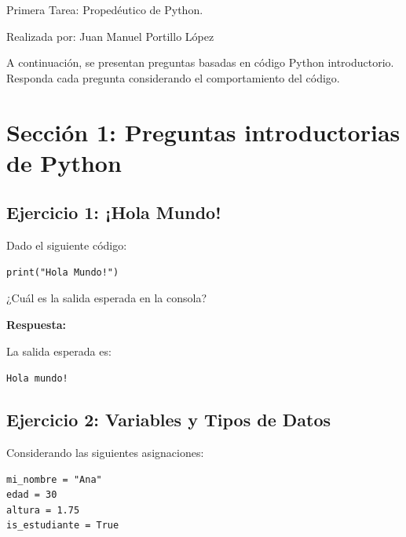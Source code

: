 \documentclass[12pt]{article}
\newcommand{\respuesta}{
    \vspace{0.3cm}
    \noindent\textbf{Respuesta:}
    \vspace{0.2cm}
}
\begin{document}
\begin{center}
    {\LARGE Primera Tarea: Propedéutico de Python.}

    \vspace{0.5cm}

    {\large Realizada por: Juan Manuel Portillo López}
\end{center}

\vspace{1cm}

\noindent
A continuación, se presentan preguntas basadas en código Python introductorio. 
Responda cada pregunta considerando el comportamiento del código.

\vspace{0.8cm}

\section*{Sección 1: Preguntas introductorias de Python}

\subsection*{Ejercicio 1: ¡Hola Mundo!}

Dado el siguiente código:

\begin{lstlisting}
print("Hola Mundo!")
\end{lstlisting}

¿Cuál es la salida esperada en la consola?

\respuesta

La salida esperada es:

\begin{center}
\texttt{Hola mundo!}
\end{center}

\subsection*{Ejercicio 2: Variables y Tipos de Datos}

Considerando las siguientes asignaciones:

\begin{lstlisting}
mi_nombre = "Ana"
edad = 30
altura = 1.75
is_estudiante = True
\end{lstlisting}
\end{document}
